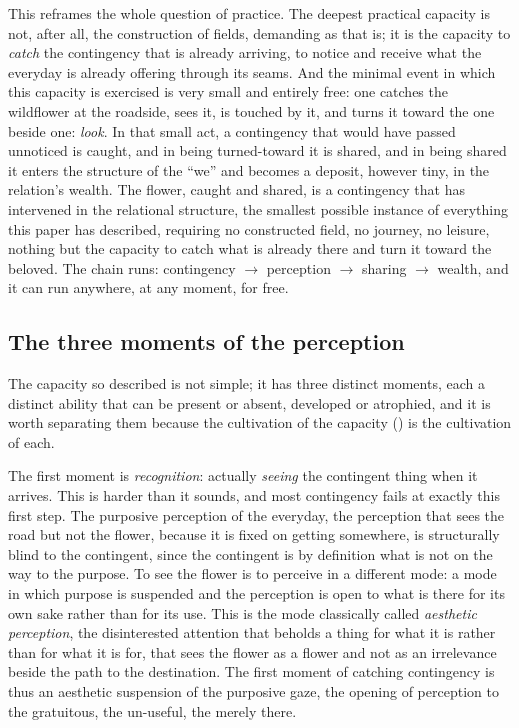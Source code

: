 This reframes the whole question of practice. The deepest practical capacity is not, after all, the construction of fields, demanding as that is; it is the capacity to \emph{catch} the contingency that is already arriving, to notice and receive what the everyday is already offering through its seams. And the minimal event in which this capacity is exercised is very small and entirely free: one catches the wildflower at the roadside, sees it, is touched by it, and turns it toward the one beside one: \emph{look}. In that small act, a contingency that would have passed unnoticed is caught, and in being turned-toward it is shared, and in being shared it enters the structure of the ``we'' and becomes a deposit, however tiny, in the relation's wealth. The flower, caught and shared, is a contingency that has intervened in the relational structure, the smallest possible instance of everything this paper has described, requiring no constructed field, no journey, no leisure, nothing but the capacity to catch what is already there and turn it toward the beloved. The chain runs: contingency \(\to\) perception \(\to\) sharing \(\to\) wealth, and it can run anywhere, at any moment, for free.

\subsection{The three moments of the perception}
\label{p21:sub:ap-moments}

The capacity so described is not simple; it has three distinct moments, each a distinct ability that can be present or absent, developed or atrophied, and it is worth separating them because the cultivation of the capacity () is the cultivation of each.

The first moment is \emph{recognition}: actually \emph{seeing} the contingent thing when it arrives. This is harder than it sounds, and most contingency fails at exactly this first step. The purposive perception of the everyday, the perception that sees the road but not the flower, because it is fixed on getting somewhere, is structurally blind to the contingent, since the contingent is by definition what is not on the way to the purpose. To see the flower is to perceive in a different mode: a mode in which purpose is suspended and the perception is open to what is there for its own sake rather than for its use. This is the mode classically called \emph{aesthetic perception}, the disinterested attention that beholds a thing for what it is rather than for what it is for, that sees the flower as a flower and not as an irrelevance beside the path to the destination. The first moment of catching contingency is thus an aesthetic suspension of the purposive gaze, the opening of perception to the gratuitous, the un-useful, the merely there.

